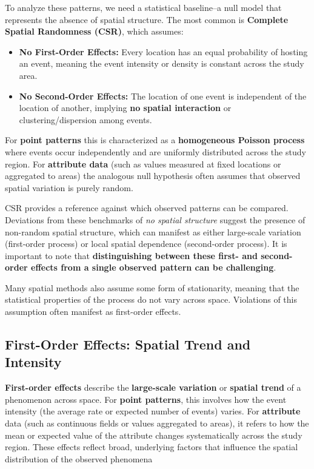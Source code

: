 \documentclass[
  letterpaper,
]{book}
\providecommand{\tightlist}{%
  \setlength{\itemsep}{0pt}\setlength{\parskip}{0pt}}
\begin{document}
To analyze these patterns, we need a statistical baseline--a null model
that represents the absence of spatial structure. The most common is
\textbf{Complete Spatial Randomness (CSR)}, which assumes:

\begin{itemize}
\tightlist
\item
  \textbf{No First-Order Effects:} Every location has an equal
  probability of hosting an event, meaning the event intensity or
  density is constant across the study area.
\item
  \textbf{No Second-Order Effects:} The location of one event is
  independent of the location of another, implying \textbf{no spatial
  interaction} or clustering/dispersion among events.
\end{itemize}

For \textbf{point patterns} this is characterized as a
\textbf{homogeneous Poisson process} where events occur independently
and are uniformly distributed across the study region. For
\textbf{attribute data} (such as values measured at fixed locations or
aggregated to areas) the analogous null hypothesis often assumes that
observed spatial variation is purely random.

CSR provides a reference against which observed patterns can be
compared. Deviations from these benchmarks of \emph{no spatial
structure} suggest the presence of non-random spatial structure, which
can manifest as either large-scale variation (first-order process) or
local spatial dependence (second-order process). It is important to note
that \textbf{distinguishing between these first- and second-order
effects from a single observed pattern can be challenging}.

Many spatial methods also assume some form of stationarity, meaning that
the statistical properties of the process do not vary across space.
Violations of this assumption often manifest as first-order effects.

\subsection{First-Order Effects: Spatial Trend and
Intensity}\label{first-order-effects-spatial-trend-and-intensity}

\textbf{First-order effects} describe the \textbf{large-scale variation}
or \textbf{spatial trend} of a phenomenon across space. For
\textbf{point patterns}, this involves how the event intensity (the
average rate or expected number of events) varies. For
\textbf{attribute} data (such as continuous fields or values aggregated
to areas), it refers to how the mean or expected value of the attribute
changes systematically across the study region. These effects reflect
broad, underlying factors that influence the spatial distribution of the
observed phenomena
\end{document}
